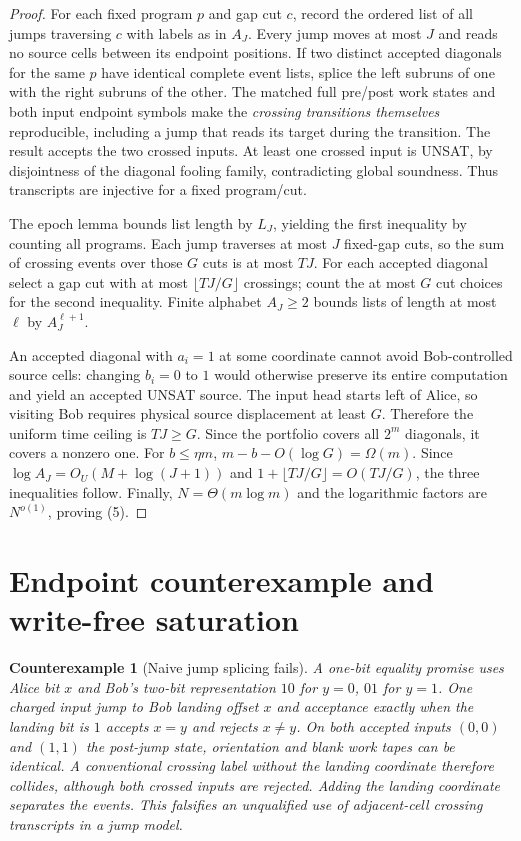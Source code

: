 \documentclass[11pt]{article}
\newtheorem{counterexample}[theorem]{Counterexample}
\begin{document}
\begin{proof}
For each fixed program $p$ and gap cut $c$, record the
ordered list of all jumps traversing $c$ with labels as in
$A_J$. Every jump moves at most $J$ and reads no source
cells between its endpoint positions. If two distinct accepted
diagonals for the same $p$ have identical complete event lists,
splice the left subruns of one with the right subruns of the
other. The matched full pre/post work states and both input
endpoint symbols make the \emph{crossing transitions themselves}
reproducible, including a jump that reads its target during
the transition. The result accepts the two crossed inputs.
At least one crossed input is UNSAT, by disjointness of the
diagonal fooling family, contradicting global soundness.
Thus transcripts are injective for a fixed program/cut.

The epoch lemma bounds list length by $L_J$, yielding
the first inequality by counting all programs.
Each jump traverses at most $J$ fixed-gap cuts, so
the sum of crossing events over those $G$ cuts is at
most $TJ$. For each accepted diagonal select a gap
cut with at most $\lfloor TJ/G\rfloor$ crossings;
count the at most $G$ cut choices for the second
inequality. Finite alphabet $A_J\ge2$ bounds
lists of length at most $\ell$ by $A_J^{\ell+1}$.

An accepted diagonal with $a_i=1$ at some coordinate
cannot avoid Bob-controlled source cells: changing
$b_i=0$ to $1$ would otherwise preserve its entire
computation and yield an accepted UNSAT source.
The input head starts left of Alice, so visiting Bob
requires physical source displacement at least $G$.
Therefore the uniform time ceiling is $TJ\ge G$.
Since the portfolio covers all $2^m$ diagonals,
it covers a nonzero one. For $b\le\eta m$,
$m-b-O(\log G)=\Omega(m)$.
Since $\log A_J=O_U(M+\log(J+1))$ and
$1+\lfloor TJ/G\rfloor=O(TJ/G)$, the three
inequalities follow. Finally,
$N=\Theta(m\log m)$ and the logarithmic
factors are $N^{o(1)}$, proving (5).
\end{proof}

\section{Endpoint counterexample and write-free saturation}
\begin{counterexample}[Naive jump splicing fails]
A one-bit equality promise uses Alice bit $x$ and Bob's
two-bit representation $10$ for $y=0$, $01$ for $y=1$.
One charged input jump to Bob landing offset $x$
and acceptance exactly when the landing bit is $1$
accepts $x=y$ and rejects $x\ne y$.
On both accepted inputs $(0,0)$ and $(1,1)$
the post-jump state, orientation and blank work tapes
can be identical. A conventional crossing label
\emph{without the landing coordinate} therefore
collides, although both crossed inputs are rejected.
Adding the landing coordinate separates the events.
This falsifies an unqualified use of adjacent-cell
crossing transcripts in a jump model.
\end{counterexample}
\end{document}
